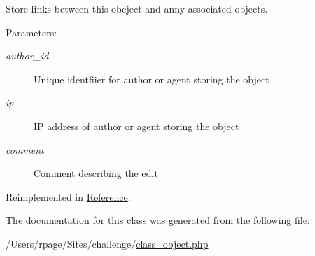 Store links between this obeject and anny associated objects. 

\begin{Desc}
\item[Parameters:]
\begin{description}
\item[{\em author\_\-id}]Unique identfiier for author or agent storing the object \item[{\em ip}]IP address of author or agent storing the object \item[{\em comment}]Comment describing the edit \end{description}
\end{Desc}


Reimplemented in \hyperlink{class_reference_fdc9cb746064d8934a3cb8b4b7c66ca6}{Reference}.

The documentation for this class was generated from the following file:\begin{CompactItemize}
\item 
/Users/rpage/Sites/challenge/\hyperlink{class__object_8php}{class\_\-object.php}\end{CompactItemize}
